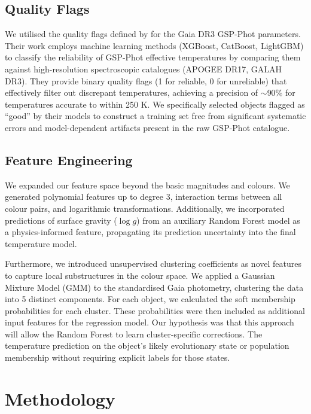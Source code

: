 \documentclass[preprint,12pt,authoryear]{elsarticle}
\begin{document}
\subsection{Quality Flags}
We utilised the quality flags defined by \cite{Avdeeva2024} for the Gaia DR3 GSP-Phot parameters. 
Their work employs machine learning methods (XGBoost, CatBoost, LightGBM) to classify the reliability of GSP-Phot effective temperatures by comparing them against high-resolution spectroscopic catalogues (APOGEE DR17, GALAH DR3). 
They provide binary quality flags (1 for reliable, 0 for unreliable) that effectively filter out discrepant temperatures, achieving a precision of $\sim$90\% for temperatures accurate to within 250 K. 
We specifically selected objects flagged as ``good'' by their models to construct a training set free from significant systematic errors and model-dependent artifacts present in the raw GSP-Phot catalogue.

\subsection{Feature Engineering}
We expanded our feature space beyond the basic magnitudes and colours. 
We generated polynomial features up to degree 3, interaction terms between all colour pairs, and logarithmic transformations. 
Additionally, we incorporated predictions of surface gravity ($\log g$) from an auxiliary Random Forest model as a physics-informed feature, propagating its prediction uncertainty into the final temperature model.

Furthermore, we introduced unsupervised clustering coefficients as novel features to capture local substructures in the colour space. 
We applied a Gaussian Mixture Model (GMM) \citep{GMM} to the standardised Gaia photometry, clustering the data into 5 distinct components. 
For each object, we calculated the soft membership probabilities for each cluster. 
These probabilities were then included as additional input features for the regression model. 
Our hypothesis was that this approach will allow the Random Forest to learn cluster-specific corrections. 
The temperature prediction on the object's likely evolutionary state or population membership without requiring explicit labels for those states.

\section{Methodology}
\label{sec:methods}
\end{document}
